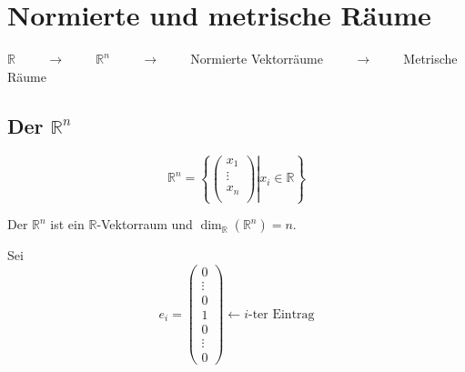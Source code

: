 

\newcommand{\Semester}{SoSe 2015}
\newcommand{\fach}{Analysis 2}
\newcommand{\prof}{Prof.\ Ebert}





\maketitle
{}


\newpage

\tableofcontents
\cleardoubleoddemptypage
{}
\setcounter{page}{1}


\section{Normierte und metrische Räume} %
\label{sec:Normierte und metrische Räume}

\begin{centering}
	$\mathbb{R} \hspace{1cm} \rightarrow{} \hspace{1cm}  \mathbb{R}^n \hspace{1cm}  \rightarrow{} \hspace{1cm}  $Normierte Vektorräume$ \hspace{1cm} \rightarrow \hspace{1cm}  $Metrische Räume
\end{centering}

\subsection{Der $\mathbb{R}^n$} %
\label{sub:der_mathbb_r_n}

\[
	\mathbb{R}^n = \left\{ \left. \begin{pmatrix} x_1 \\ \vdots \\ x_n \\ \end{pmatrix}  \right| x_i \in \mathbb{R} \right\}
\]

Der $\mathbb{R}^n$ ist ein $\mathbb{R}$-Vektorraum und $\dim_{\mathbb{R}}(\mathbb{R}^n)=n$.

Sei
\[
	e_i = \begin{pmatrix} 0 \\ \vdots \\ 0 \\ 1 \\ 0 \\ \vdots \\ 0 \end{pmatrix} \leftarrow \text{$i$-ter Eintrag}
\]

